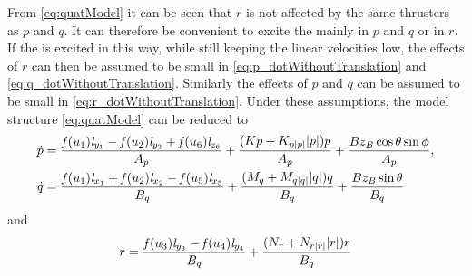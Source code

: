 From \eqref{eq:quatModel} it can be seen that $r$ is not affected by the same thrusters as $p$ and $q$. It can therefore be convenient to excite the \abbrROV mainly in $p$ and $q$ or in $r$. If the \abbrROV is excited in this way, while still keeping the linear velocities low, the effects of $r$ can then be assumed to be small in \eqref{eq:p_dotWithoutTranslation} and \eqref{eq:q_dotWithoutTranslation}. Similarly the effects of $p$ and $q$ can be assumed to be small in \eqref{eq:r_dotWithoutTranslation}. Under these assumptions, the model structure \eqref{eq:quatModel} can be reduced to
\begin{subequations} \label{eq:pq_dot_decouple}
\begin{align} \label{eq:pq_dot_decouple1}
\dot{p} &= \frac{\mathit{f}(u_{1}) \mathit{l}_{y_{1}} - \mathit{f}(u_{2}) \mathit{l}_{y_{2}} + \mathit{f}(u_{6}) \mathit{l}_{z_{6}}}{A_p} + \frac{(Kp + K_{p|p|} |p|)p}{A_p} + \frac{B z_B \cos{\theta} \sin{\phi}}{A_p}, \\ \label{eq:pq_dot_decouple2}
\dot{q} &=\frac{\mathit{f}(u_{1}) \mathit{l}_{x_{1}} + \mathit{f}(u_{2}) \mathit{l}_{x_{2}} - \mathit{f}(u_{5}) \mathit{l}_{x_{5}}}{B_q} + \frac{(M_{q} + M_{q|q|} |q|)q}{B_q} + \frac{B z_B \sin{\theta}}{B_q} 
\end{align}
\end{subequations} and
\begin{equation} \label{eq:r_dot_decouple}
\dot{r} = \frac{\mathit{f}(u_{3}) \mathit{l}_{y_{3}} - \mathit{f}(u_{4}) \mathit{l}_{y_{4}}}{B_q} + \frac{(N_{r} + N_{r|r|} |r|)r}{B_q}
\end{equation}



